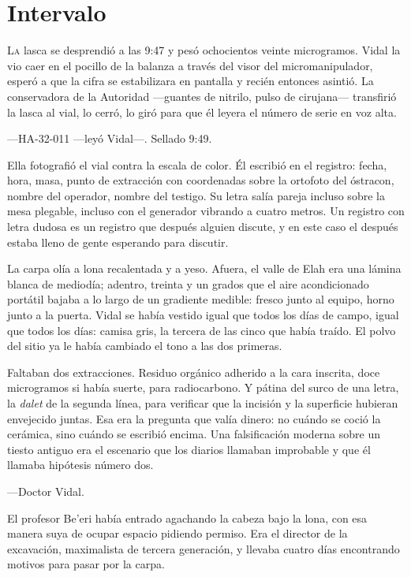 \chapter{Intervalo}

\lettrine[lines=2, lhang=0.1, nindent=0.2em]{L}{a} lasca se desprendió a las 9:47 y pesó ochocientos veinte microgramos. Vidal la vio caer en el pocillo de la balanza a través del visor del micromanipulador, esperó a que la cifra se estabilizara en pantalla y recién entonces asintió. La conservadora de la Autoridad ---guantes de nitrilo, pulso de cirujana--- transfirió la lasca al vial, lo cerró, lo giró para que él leyera el número de serie en voz alta.


---HA-32-011 ---leyó Vidal---. Sellado 9:49.

Ella fotografió el vial contra la escala de color. Él escribió en el registro: fecha, hora, masa, punto de extracción con coordenadas sobre la ortofoto del óstracon, nombre del operador, nombre del testigo. Su letra salía pareja incluso sobre la mesa plegable, incluso con el generador vibrando a cuatro metros. Un registro con letra dudosa es un registro que después alguien discute, y en este caso el después estaba lleno de gente esperando para discutir.

La carpa olía a lona recalentada y a yeso. Afuera, el valle de Elah era una lámina blanca de mediodía; adentro, treinta y un grados que el aire acondicionado portátil bajaba a lo largo de un gradiente medible: fresco junto al equipo, horno junto a la puerta. Vidal se había vestido igual que todos los días de campo, igual que todos los días: camisa gris, la tercera de las cinco que había traído. El polvo del sitio ya le había cambiado el tono a las dos primeras.

Faltaban dos extracciones. Residuo orgánico adherido a la cara inscrita, doce microgramos si había suerte, para radiocarbono. Y pátina del surco de una letra, la \textit{dalet} de la segunda línea, para verificar que la incisión y la superficie hubieran envejecido juntas. Esa era la pregunta que valía dinero: no cuándo se coció la cerámica, sino cuándo se escribió encima. Una falsificación moderna sobre un tiesto antiguo era el escenario que los diarios llamaban improbable y que él llamaba hipótesis número dos.

---Doctor Vidal.

El profesor Be'eri había entrado agachando la cabeza bajo la lona, con esa manera suya de ocupar espacio pidiendo permiso. Era el director de la excavación, maximalista de tercera generación, y llevaba cuatro días encontrando motivos para pasar por la carpa.

